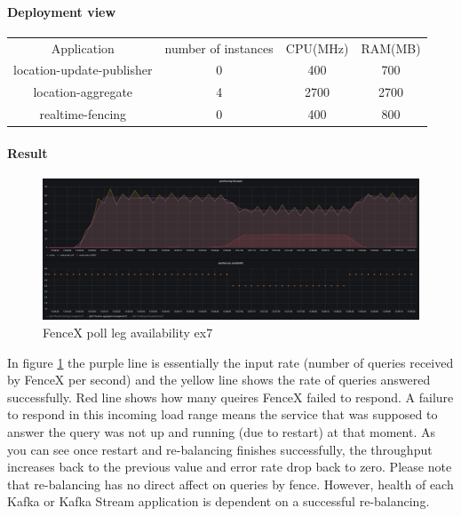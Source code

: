 \documentclass[a4]{report}
\begin{document}
        \paragraph{Deployment view}
        \begin{center}
            \begin{tabular}{ c c c c }
                Application               & number of instances & CPU(MHz) & RAM(MB) \\
                location-update-publisher & 0                   & 400      & 700     \\
                location-aggregate        & 4                   & 2700     & 2700    \\
                realtime-fencing          & 0                   & 400      & 800     \\
            \end{tabular}
        \end{center}

        \paragraph{Result}
        \begin{figure}[ht]
            \caption{FenceX poll leg availability ex7}
            \label{fig:ex7}
            \includegraphics[scale=0.4]{images/evaluation/ex7-benchmarking-ongoing-2per10sec.png}
        \end{figure}

        In figure \ref{fig:ex7} the purple line is essentially the input rate (number of queries received by FenceX per
        second) and the yellow line shows the rate of queries answered successfully.
        Red line shows how many queires FenceX failed to respond.
        A failure to respond in this incoming load range means the service that was supposed to answer the query was not
        up and running (due to restart) at that moment.
        As you can see once restart and re-balancing finishes successfully, the throughput increases back to the previous
        value and error rate drop back to zero.
        Please note that re-balancing has no direct affect on queries by fence.
        However, health of each Kafka or Kafka Stream application is dependent on a successful re-balancing.
\end{document}
